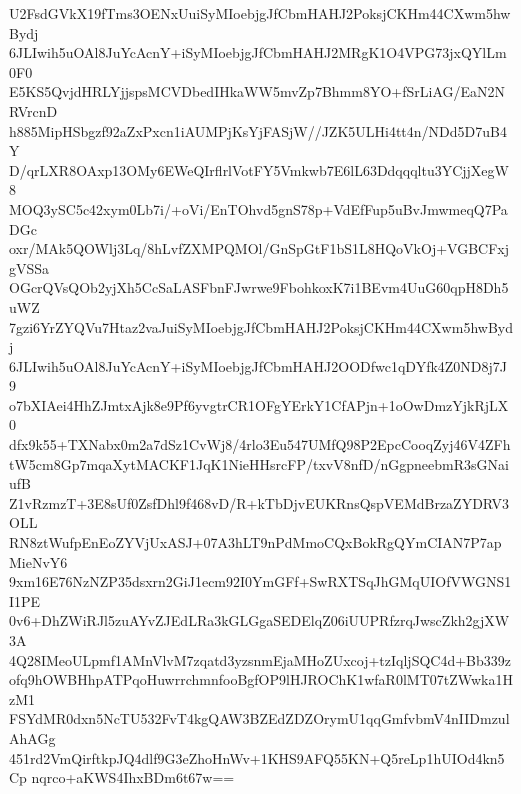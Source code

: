 U2FsdGVkX19fTms3OENxUuiSyMIoebjgJfCbmHAHJ2PoksjCKHm44CXwm5hwBydj
6JLIwih5uOAl8JuYcAcnY+iSyMIoebjgJfCbmHAHJ2MRgK1O4VPG73jxQYlLm0F0
E5KS5QvjdHRLYjjspsMCVDbedIHkaWW5mvZp7Bhmm8YO+fSrLiAG/EaN2NRVrcnD
h885MipHSbgzf92aZxPxcn1iAUMPjKsYjFASjW//JZK5ULHi4tt4n/NDd5D7uB4Y
D/qrLXR8OAxp13OMy6EWeQIrflrlVotFY5Vmkwb7E6lL63Ddqqqltu3YCjjXegW8
MOQ3ySC5c42xym0Lb7i/+oVi/EnTOhvd5gnS78p+VdEfFup5uBvJmwmeqQ7PaDGc
oxr/MAk5QOWlj3Lq/8hLvfZXMPQMOl/GnSpGtF1bS1L8HQoVkOj+VGBCFxjgVSSa
OGcrQVsQOb2yjXh5CcSaLASFbnFJwrwe9FbohkoxK7i1BEvm4UuG60qpH8Dh5uWZ
7gzi6YrZYQVu7Htaz2vaJuiSyMIoebjgJfCbmHAHJ2PoksjCKHm44CXwm5hwBydj
6JLIwih5uOAl8JuYcAcnY+iSyMIoebjgJfCbmHAHJ2OODfwc1qDYfk4Z0ND8j7J9
o7bXIAei4HhZJmtxAjk8e9Pf6yvgtrCR1OFgYErkY1CfAPjn+1oOwDmzYjkRjLX0
dfx9k55+TXNabx0m2a7dSz1CvWj8/4rlo3Eu547UMfQ98P2EpcCooqZyj46V4ZFh
tW5cm8Gp7mqaXytMACKF1JqK1NieHHsrcFP/txvV8nfD/nGgpneebmR3sGNaiufB
Z1vRzmzT+3E8sUf0ZsfDhl9f468vD/R+kTbDjvEUKRnsQspVEMdBrzaZYDRV3OLL
RN8ztWufpEnEoZYVjUxASJ+07A3hLT9nPdMmoCQxBokRgQYmCIAN7P7apMieNvY6
9xm16E76NzNZP35dsxrn2GiJ1ecm92I0YmGFf+SwRXTSqJhGMqUIOfVWGNS1I1PE
0v6+DhZWiRJl5zuAYvZJEdLRa3kGLGgaSEDElqZ06iUUPRfzrqJwscZkh2gjXW3A
4Q28IMeoULpmf1AMnVlvM7zqatd3yzsnmEjaMHoZUxcoj+tzIqljSQC4d+Bb339z
ofq9hOWBHhpATPqoHuwrrchmnfooBgfOP9lHJROChK1wfaR0lMT07tZWwka1HzM1
FSYdMR0dxn5NcTU532FvT4kgQAW3BZEdZDZOrymU1qqGmfvbmV4nIIDmzulAhAGg
451rd2VmQirftkpJQ4dlf9G3eZhoHnWv+1KHS9AFQ55KN+Q5reLp1hUIOd4kn5Cp
nqrco+aKWS4IhxBDm6t67w==
